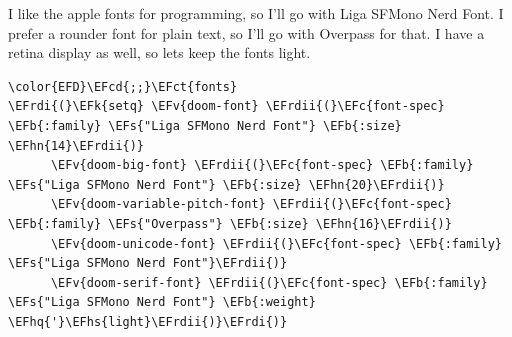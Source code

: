 \documentclass{scrartcl}
\newcommand{\EFk}[1]{\textcolor{EFk}{#1}} %
\newcommand{\EFs}[1]{\textcolor{EFs}{#1}} %
\newcommand{\EFb}[1]{\textcolor{EFb}{#1}} %
\newcommand{\EFct}[1]{\textcolor{EFct}{#1}} %
\newcommand{\EFc}[1]{\textcolor{EFc}{#1}} %
\newcommand{\EFv}[1]{\textcolor{EFv}{#1}} %
\newcommand{\EFcd}[1]{\textcolor{EFcd}{#1}} %
\newcommand{\EFhn}[1]{\textcolor{EFhn}{\textbf{#1}}} %
\newcommand{\EFhq}[1]{\textcolor{EFhq}{#1}} %
\newcommand{\EFhs}[1]{\textcolor{EFhs}{#1}} %
\newcommand{\EFrdi}[1]{\textcolor{EFrdi}{#1}} %
\newcommand{\EFrdii}[1]{\textcolor{EFrdii}{#1}} %
\begin{document}
I like the apple fonts for programming, so I'll go with Liga SFMono Nerd Font. I
prefer a rounder font for plain text, so I'll go with Overpass for that. I have a retina display as well, so lets keep the fonts light.
\begin{Code}
\begin{Verbatim}[]
\color{EFD}\EFcd{;;}\EFct{fonts}
\EFrdi{(}\EFk{setq} \EFv{doom-font} \EFrdii{(}\EFc{font-spec} \EFb{:family} \EFs{"Liga SFMono Nerd Font"} \EFb{:size} \EFhn{14}\EFrdii{)}
      \EFv{doom-big-font} \EFrdii{(}\EFc{font-spec} \EFb{:family} \EFs{"Liga SFMono Nerd Font"} \EFb{:size} \EFhn{20}\EFrdii{)}
      \EFv{doom-variable-pitch-font} \EFrdii{(}\EFc{font-spec} \EFb{:family} \EFs{"Overpass"} \EFb{:size} \EFhn{16}\EFrdii{)}
      \EFv{doom-unicode-font} \EFrdii{(}\EFc{font-spec} \EFb{:family} \EFs{"Liga SFMono Nerd Font"}\EFrdii{)}
      \EFv{doom-serif-font} \EFrdii{(}\EFc{font-spec} \EFb{:family} \EFs{"Liga SFMono Nerd Font"} \EFb{:weight} \EFhq{'}\EFhs{light}\EFrdii{)}\EFrdi{)}
\end{Verbatim}
\end{Code}
\end{document}
